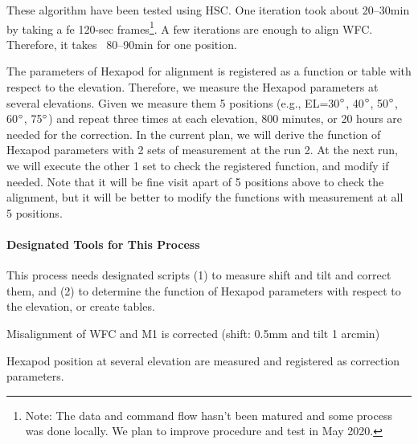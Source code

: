 These algorithm have been tested using HSC.
One iteration took about 20--30min by taking a fe 120-sec frames\footnote{Note: The data and command flow hasn't been matured and some process was done locally. We plan to improve procedure and test in May 2020.}.
A few iterations are enough to align WFC.
Therefore, it takes ~80--90min for one position.

The parameters of Hexapod for alignment is registered as a function or table with respect to the elevation.
Therefore, we measure the Hexapod parameters at several elevations.
Given we measure them 5 positions (e.g., EL=30$^\circ$, 40$^\circ$, 50$^\circ$, 60$^\circ$, 75$^\circ$) and repeat three times at each elevation, 800 minutes, or 20 hours are needed for the correction.
In the current plan, we will derive the function of Hexapod parameters with 2 sets of measurement at the run 2.
At the next run, we will execute the other 1 set to check the registered function, and modify if needed.
Note that it will be fine visit apart of 5 positions above to check the alignment, but it will be better to modify the functions with measurement at all 5 positions.


\smallskip
\paragraph{Designated Tools for This Process}
This process needs designated scripts
(1) to measure shift and tilt and correct them, and
(2) to determine the function of Hexapod parameters with respect to the elevation, or create tables. 


\begin{itembox}[l]{}
Misalignment of  WFC and M1 is corrected (shift: 0.5mm and tilt 1 arcmin)

Hexapod position at several elevation are measured and registered as correction parameters.

\end{itembox}